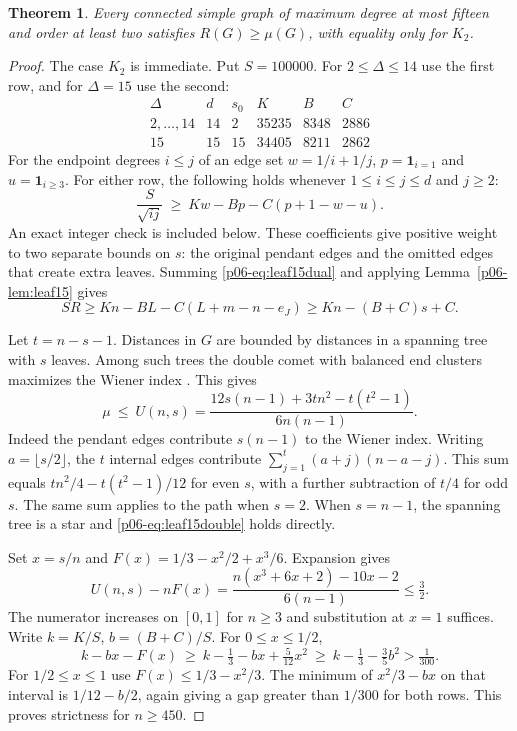 \documentclass[11pt,a4paper]{article}
\newtheorem{theorem}{Theorem}[section]
\begin{document}
\begin{theorem}\label{p06-thm:leaf15}
Every connected simple graph of maximum degree at most fifteen and order
at least two satisfies $R(G)\ge\mu(G)$, with equality only for $K_2$.
\end{theorem}
\begin{proof}
The case $K_2$ is immediate. Put $S=100000$. For $2\le\Delta\le14$
use the first row, and for $\Delta=15$ use the second:
\[
\begin{array}{c|rrrrr}
\Delta&d&s_0&K&B&C\\ \hline
2,\ldots,14&14&2&35235&8348&2886\\
15&15&15&34405&8211&2862
\end{array}
\]
For the endpoint degrees $i\le j$ of an edge set $w=1/i+1/j$,
$p=\mathbf{1}_{i=1}$ and $u=\mathbf{1}_{i\ge3}$.
For either row, the following holds whenever $1\le i\le j\le d$ and
$j\ge2$:
\begin{equation}\label{p06-eq:leaf15dual}
 \frac{S}{\sqrt{ij}}\ \ge\ K w-Bp-C(p+1-w-u).
\end{equation}
An exact integer check is included below. These coefficients give
positive weight to two separate bounds on $s$: the original pendant
edges and the omitted edges that create extra leaves. Summing
\eqref{p06-eq:leaf15dual} and applying Lemma~\ref{p06-lem:leaf15} gives
\[
  S R\ge Kn-BL-C(L+m-n-e_J)\ge Kn-(B+C)s+C.
\]

Let $t=n-s-1$. Distances in $G$ are bounded by distances in a
spanning tree with $s$ leaves. Among such trees the double comet with
balanced end clusters maximizes the Wiener index
\cite[Lemma~2.4 and the observation following it]{p06-CPSMean}. This gives
\begin{equation}\label{p06-eq:leaf15double}
 \mu\ \le\ U(n,s)=\frac{12s(n-1)+3tn^2-t(t^2-1)}{6n(n-1)}.
\end{equation}
Indeed the pendant edges contribute $s(n-1)$ to the Wiener index.
Writing $a=\lfloor s/2\rfloor$, the $t$ internal edges contribute
$\sum_{j=1}^t(a+j)(n-a-j)$. This sum equals
$tn^2/4-t(t^2-1)/12$ for even $s$, with a further subtraction of
$t/4$ for odd $s$. The same sum applies to the path when $s=2$. When $s=n-1$, the spanning tree is a star and
\eqref{p06-eq:leaf15double} holds directly.

Set $x=s/n$ and $F(x)=1/3-x^2/2+x^3/6$. Expansion gives
\[
 U(n,s)-nF(x)
 =\frac{n(x^3+6x+2)-10x-2}{6(n-1)}\le\tfrac32 .
\]
The numerator increases on $[0,1]$ for $n\ge3$ and substitution at
$x=1$ suffices. Write $k=K/S$, $b=(B+C)/S$. For $0\le x\le1/2$,
\[
  k-bx-F(x)\ \ge\ k-\tfrac13-bx+\tfrac5{12}x^2
        \ \ge\ k-\tfrac13-\tfrac35 b^2>\tfrac1{300}.
\]
For $1/2\le x\le1$ use $F(x)\le1/3-x^2/3$. The minimum of
$x^2/3-bx$ on that interval is $1/12-b/2$, again giving a gap
greater than $1/300$ for both rows. This proves strictness for
$n\ge450$.



\end{proof}
\end{document}
